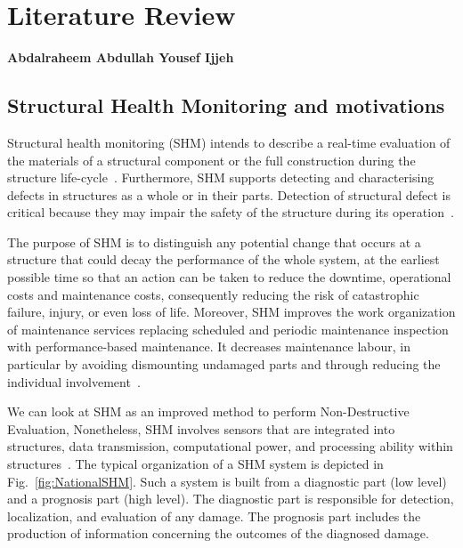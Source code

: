 \renewcommand{\figurename}{Fig.}
\renewcommand{\tablename}{Tab.}


\chapter[\DIFadd{ML for SHM: Review}]{ Literature Review}

\textbf{Abdalraheem Abdullah Yousef Ijjeh}

\tableofcontents
\newpage

\section[SHM and motivations]{Structural Health Monitoring and motivations}
 Structural health monitoring (SHM) intends to describe a real-time evaluation 
 of the materials of a structural component or the full construction during the structure life-cycle~\cite{Balageas2010}. 
 Furthermore, SHM supports detecting and characterising defects in structures 
 as a whole or in their parts.
 Detection of structural defect is critical because they may impair the safety of the structure during its operation~\cite{Yuan2016}. 

 The purpose of SHM is to distinguish any potential change that occurs at 
 a structure that could decay the performance of the whole system, at the 
 earliest possible time so that an action can be taken to reduce the downtime, 
 operational costs and maintenance costs, consequently reducing the risk of 
 catastrophic failure, injury, or even loss of life.
 Moreover, SHM improves the work organization of maintenance services replacing scheduled and periodic maintenance inspection with performance-based maintenance.
 It decreases maintenance labour, in particular by avoiding dismounting undamaged parts and through reducing the individual involvement~\cite{Balageas2010}.

We can look at SHM as an improved method to perform Non-Destructive Evaluation, 
Nonetheless, SHM involves sensors that are integrated into structures, data 
transmission, computational power, and processing ability within 
structures~\cite{Balageas2010}. 
The typical organization of a SHM system is depicted in Fig.~\ref{fig:NationalSHM}. 
Such a system is built from a diagnostic part (low level) and a prognosis part (high level).
The diagnostic part is responsible for detection, localization, and evaluation of any damage.
The prognosis part includes the production of information concerning the outcomes of the diagnosed damage.

